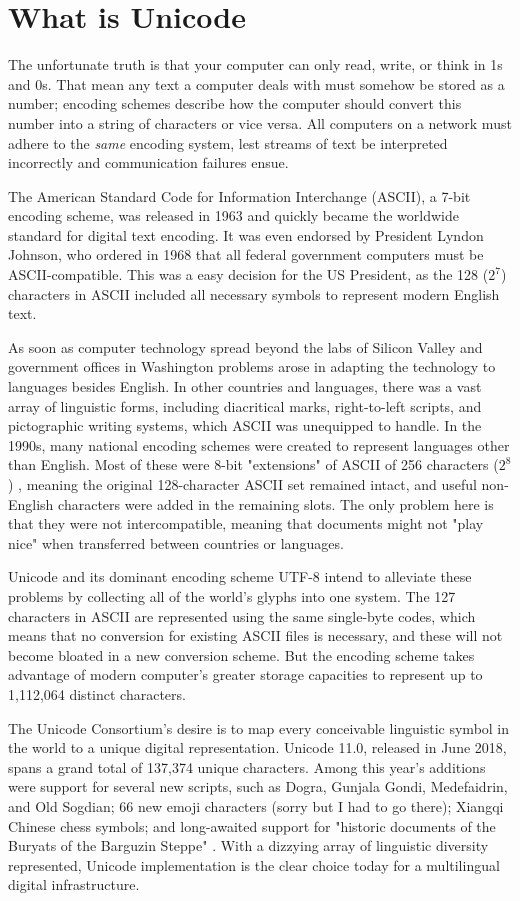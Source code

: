 \section{What is Unicode}

The unfortunate truth is that your computer can only read, write, or think in 1s
and 0s. That mean any text a computer deals with must somehow be stored as a
number; encoding schemes describe how the computer should convert this number
into a string of characters or vice versa. All computers on a network must
adhere to the \textit{same} encoding system, lest streams of text be interpreted
incorrectly and communication failures ensue.

The American Standard Code for Information Interchange (ASCII), a 7-bit encoding
scheme, was released in 1963 and quickly became the worldwide standard for
digital text encoding. It was even endorsed by President Lyndon Johnson, who
ordered in 1968 that all federal government computers must be ASCII-compatible.
This was a easy decision for the US President, as the 128 ($2^7$) characters in
ASCII included all necessary symbols to represent modern English text.
\parencite{tero12}

As soon as computer technology spread beyond the labs of Silicon Valley and
government offices in Washington problems arose in adapting the technology to
languages besides English. In other countries and languages, there was a vast
array of linguistic forms, including diacritical marks, right-to-left scripts,
and pictographic writing systems, which ASCII was unequipped to handle. In the
1990s, many national encoding schemes were created to represent languages other
than English. Most of these were 8-bit "extensions" of ASCII of 256 characters
($2^8$) , meaning the original 128-character ASCII set remained intact, and
useful non-English characters were added in the remaining slots. The only
problem here is that they were not intercompatible, meaning that documents might
not "play nice" when transferred between countries or languages.
\parencite{tero12}

Unicode and its dominant encoding scheme UTF-8 intend to alleviate these
problems by collecting all of the world's glyphs into one system. The 127
characters in ASCII are represented using the same single-byte codes, which
means that no conversion for existing ASCII files is necessary, and these will
not become bloated in a new conversion scheme. But the encoding scheme takes
advantage of modern computer's greater storage capacities to represent up to
1,112,064 distinct characters. 

The Unicode Consortium's desire is to map every conceivable linguistic symbol in
the world to a unique digital representation. Unicode 11.0, released in June
2018, spans a grand total of 137,374 unique characters. Among this year's
additions were support for several new scripts, such as Dogra, Gunjala Gondi,
Medefaidrin, and Old Sogdian; 66 new emoji characters (sorry but I had to go
there); Xiangqi Chinese chess symbols; and long-awaited support for "historic
documents of the Buryats of the Barguzin Steppe" \parencite{unicode11}. With a
dizzying array of linguistic diversity represented, Unicode implementation is
the clear choice today for a multilingual digital infrastructure.
